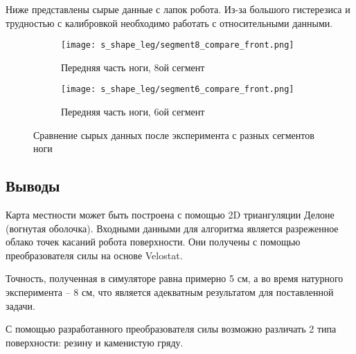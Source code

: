 Ниже  представлены сырые данные с лапок робота. Из-за большого гистерезиса и трудностью с калибровкой необходимо работать с относительными данными.

\begin{figure}[H]
    \begin{subfigure}[t]{0.49\textwidth}
        \centering\texttt{[image: s\_shape\_leg/segment8\_compare\_front.png]}
        \caption{Передняя часть ноги, 8ой сегмент}
    \end{subfigure}
    \begin{subfigure}[t]{0.49\textwidth}
        \centering\texttt{[image: s\_shape\_leg/segment6\_compare\_front.png]}
        \caption{Передняя часть ноги, 6ой сегмент}
    \end{subfigure}
    \caption{Сравнение сырых данных после эксперимента с разных сегментов ноги}
    \label{fig:data_from_legs}
\end{figure}


\subsection{Выводы}

Карта местности может быть построена с помощью 2D триангуляции Делоне (вогнутая оболочка). Входными данными для алгоритма является разреженное облако точек касаний робота поверхности. Они получены с помощью преобразователя силы на основе Velostat.

Точность, полученная в симуляторе равна примерно 5 см, а во время натурного эксперимента -- 8 см, что является адекватным результатом для поставленной задачи.

С помощью разработанного преобразователя силы возможно различать 2 типа поверхности: резину и каменистую гряду.